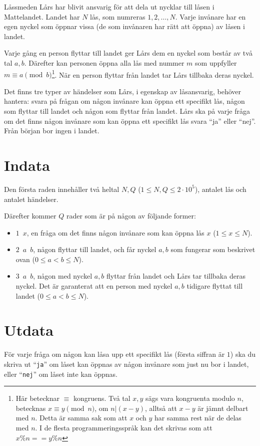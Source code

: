 Låssmeden Lårs har blivit ansvarig för att dela ut nycklar till låsen i Mattelandet. Landet har $N$ lås, som numreras $1,2,\ldots,N$. Varje invånare har en egen nyckel som öppnar vissa (de som invånaren har rätt att öppna) av låsen i landet.

Varje gång en person flyttar till landet ger Lårs dem en nyckel som består av två tal $a,b$. Därefter kan personen öppna alla lås med nummer $m$ som uppfyller $m\equiv a \pmod{b}$\footnote{Här betecknar $\equiv$ kongruens. Två tal $x,y$ sägs vara kongruenta modulo $n$, betecknas $x\equiv y \pmod{n}$, om $n|(x-y)$, alltså att $x-y$ är jämnt delbart med $n$. Detta är samma sak som att $x$ och $y$ har samma rest när de delas med $n$. I de flesta programmeringsspråk kan det skrivas som att $x\%n==y\%n$}. När en person flyttar från landet tar Lårs tillbaka deras nyckel. 

Det finns tre typer av händelser som Lårs, i egenskap av låsansvarig, behöver hantera: svara på frågan om någon invånare kan öppna ett specifikt lås, någon som flyttar till landet och någon som flyttar från landet. Lårs ska på varje fråga om det finns någon invånare som kan öppna ett specifikt lås svara ``ja'' eller ``nej''. Från början bor ingen i landet.

\section*{Indata}
Den första raden innehåller två heltal $N,Q$ ($1\leq N,Q \leq 2\cdot 10^5$), antalet lås och antalet händelser.

Därefter kommer $Q$ rader som är på någon av följande former:
\begin{itemize}
  \item $1\enspace x$, en fråga om det finns någon invånare som kan öppna lås $x$ ($1\leq x \leq N$).
  \item $2\enspace a\enspace b$, någon flyttar till landet, och får nyckel $a,b$ som fungerar som beskrivet ovan ($0\leq a < b \leq N$).
  \item $3\enspace a\enspace b$, någon med nyckel $a,b$ flyttar från landet och Lårs tar tillbaka deras nyckel. Det är garanterat att en person med nyckel $a,b$ tidigare flyttat till landet ($0\leq a < b \leq N$).
\end{itemize}

\section*{Utdata}
För varje fråga om någon kan låsa upp ett specifikt lås (första siffran är $1$) ska du skriva ut ``\texttt{ja}'' om låset kan öppnas av någon invånare som just nu bor i landet, eller ``\texttt{nej}'' om låset inte kan öppnas.


